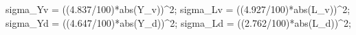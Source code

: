 sigma_Yv = ((4.837/100)*abs(Y_v))^2; 
sigma_Lv = ((4.927/100)*abs(L_v))^2;
sigma_Yd = ((4.647/100)*abs(Y_d))^2;
sigma_Ld = ((2.762/100)*abs(L_d))^2;